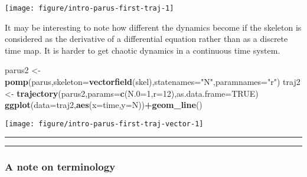 \documentclass[]{article}
\newenvironment{Shaded}{\begin{snugshade}}{\end{snugshade}}
\newcommand{\KeywordTok}[1]{\textcolor[rgb]{0.13,0.29,0.53}{\textbf{#1}}}
\newcommand{\DataTypeTok}[1]{\textcolor[rgb]{0.13,0.29,0.53}{#1}}
\newcommand{\DecValTok}[1]{\textcolor[rgb]{0.00,0.00,0.81}{#1}}
\newcommand{\StringTok}[1]{\textcolor[rgb]{0.31,0.60,0.02}{#1}}
\newcommand{\OtherTok}[1]{\textcolor[rgb]{0.56,0.35,0.01}{#1}}
\newcommand{\OperatorTok}[1]{\textcolor[rgb]{0.81,0.36,0.00}{\textbf{#1}}}
\newcommand{\NormalTok}[1]{#1}
\begin{document}
\begin{center}\texttt{[image: figure/intro-parus-first-traj-1]} \end{center}

It may be interesting to note how different the dynamics become if the
skeleton is considered as the derivative of a differential equation
rather than as a discrete time map. It is harder to get chaotic dynamics
in a continuous time system.

\begin{Shaded}
\begin{Highlighting}[]
\NormalTok{parus2 <-}\StringTok{ }\KeywordTok{pomp}\NormalTok{(parus,}\DataTypeTok{skeleton=}\KeywordTok{vectorfield}\NormalTok{(skel),}\DataTypeTok{statenames=}\StringTok{"N"}\NormalTok{,}\DataTypeTok{paramnames=}\StringTok{"r"}\NormalTok{)}
\NormalTok{traj2 <-}\StringTok{ }\KeywordTok{trajectory}\NormalTok{(parus2,}\DataTypeTok{params=}\KeywordTok{c}\NormalTok{(}\DataTypeTok{N.0=}\DecValTok{1}\NormalTok{,}\DataTypeTok{r=}\DecValTok{12}\NormalTok{),}\DataTypeTok{as.data.frame=}\OtherTok{TRUE}\NormalTok{)}
\KeywordTok{ggplot}\NormalTok{(}\DataTypeTok{data=}\NormalTok{traj2,}\KeywordTok{aes}\NormalTok{(}\DataTypeTok{x=}\NormalTok{time,}\DataTypeTok{y=}\NormalTok{N))}\OperatorTok{+}\KeywordTok{geom_line}\NormalTok{()}
\end{Highlighting}
\end{Shaded}

\begin{center}\texttt{[image: figure/intro-parus-first-traj-vector-1]} \end{center}

\begin{center}\rule{0.5\linewidth}{\linethickness}\end{center}

\begin{center}\rule{0.5\linewidth}{\linethickness}\end{center}

\subsubsection{A note on terminology}\label{a-note-on-terminology}
\end{document}

